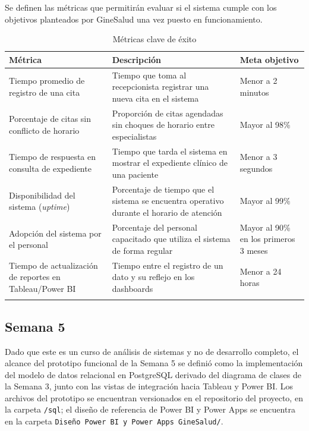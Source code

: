 \documentclass[12pt,letterpaper]{article}
\begin{document}
Se definen las métricas que permitirán evaluar si el sistema cumple con los objetivos
planteados por GineSalud una vez puesto en funcionamiento.

\begin{xltabular}{\textwidth}{|p{3.4cm}|X|p{2.8cm}|}
\hline
{}
\textbf{Métrica} & \textbf{Descripción} & \textbf{Meta objetivo} \\
\hline
\endhead
Tiempo promedio de registro de una cita & Tiempo que toma al recepcionista registrar una nueva cita en el sistema & Menor a 2 minutos \\ \hline
Porcentaje de citas sin conflicto de horario & Proporción de citas agendadas sin choques de horario entre especialistas & Mayor al 98\% \\ \hline
Tiempo de respuesta en consulta de expediente & Tiempo que tarda el sistema en mostrar el expediente clínico de una paciente & Menor a 3 segundos \\ \hline
Disponibilidad del sistema (\textit{uptime}) & Porcentaje de tiempo que el sistema se encuentra operativo durante el horario de atención & Mayor al 99\% \\ \hline
Adopción del sistema por el personal & Porcentaje del personal capacitado que utiliza el sistema de forma regular & Mayor al 90\% en los primeros 3 meses \\ \hline
Tiempo de actualización de reportes en Tableau/Power BI & Tiempo entre el registro de un dato y su reflejo en los dashboards & Menor a 24 horas \\ \hline
\caption{Métricas clave de éxito}
\end{xltabular}

\subsection{Semana 5}

Dado que este es un curso de análisis de sistemas y no de desarrollo completo, el alcance
del prototipo funcional de la Semana 5 se definió como la implementación del modelo de
datos relacional en PostgreSQL derivado del diagrama de clases de la Semana 3, junto con
las vistas de integración hacia Tableau y Power BI. Los archivos del prototipo se encuentran
versionados en el repositorio del proyecto, en la carpeta \texttt{/sql}; el diseño de
referencia de Power BI y Power Apps se encuentra en la carpeta
\texttt{Diseño Power BI y Power Apps GineSalud/}.
\end{document}
